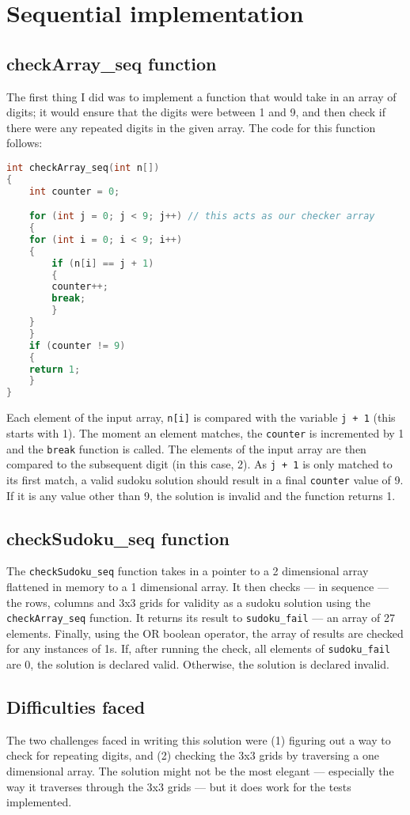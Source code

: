 \documentclass[parallelismlabreport.tex]{subfiles}
\begin{document}
\section{Sequential implementation}
\subsection{checkArray\_seq function}
The first thing I did was to implement a function that would take in an array of digits; it would ensure that the digits were between 1 and 9, and then check if there were any repeated digits in the given array. The code for this function follows:
\begin{lstlisting}[language=C]
int checkArray_seq(int n[])
{
    int counter = 0;

    for (int j = 0; j < 9; j++) // this acts as our checker array
    {
	for (int i = 0; i < 9; i++)
	{
	    if (n[i] == j + 1)
	    {
		counter++;
		break;
	    }
	}
    }
    if (counter != 9)
    {
	return 1;
    }
}
\end{lstlisting}
Each element of the input array, \verb|n[i]| is compared with the variable \verb|j + 1| (this starts with 1). The moment an element matches, the \verb|counter| is incremented by 1 and the \verb|break| function is called. The elements of the input array are then compared to the subsequent digit (in this case, 2). As \verb|j + 1| is only matched to its first match, a valid sudoku solution should result in a final \verb|counter| value of 9. If it is any value other than 9, the solution is invalid and the function returns 1.
\subsection{checkSudoku\_seq function}
The \verb|checkSudoku_seq| function takes in a pointer to a 2 dimensional array flattened in memory to a 1 dimensional array. It then checks --- in sequence --- the rows, columns and 3x3 grids for validity as a sudoku solution using the \verb|checkArray_seq| function. It returns its result to \verb|sudoku_fail| --- an array of 27 elements. Finally, using the OR boolean operator, the array of results are checked for any instances of 1s. If, after running the check, all elements of \verb|sudoku_fail| are 0, the solution is declared valid. Otherwise, the solution is declared invalid.
\subsection{Difficulties faced}
The two challenges faced in writing this solution were (1) figuring out a way to check for repeating digits, and (2) checking the 3x3 grids by traversing a one dimensional array. The solution might not be the most elegant --- especially the way it traverses through the 3x3 grids --- but it does work for the tests implemented.
\end{document}
